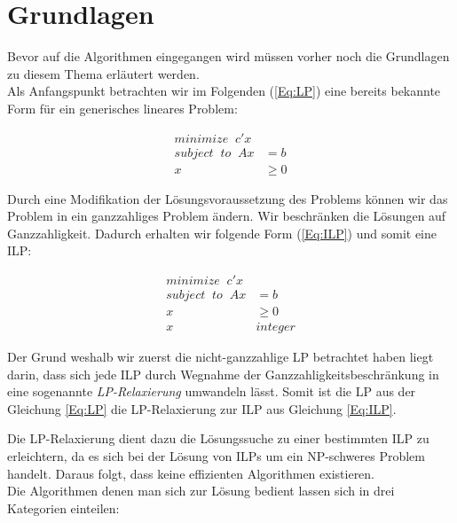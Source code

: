 \documentclass[tog]{acmsiggraph}
\begin{document}
\section{Grundlagen}

Bevor auf die Algorithmen eingegangen wird müssen vorher noch die Grundlagen zu diesem Thema erläutert werden.\\
Als Anfangspunkt betrachten wir im Folgenden (\ref{Eq:LP}) eine bereits bekannte Form für ein generisches lineares Problem:

\large
\begin{align}
\label{Eq:LP}
minimize \;\; c'x & \nonumber \\
subject \;\; to \;\; Ax &= b \nonumber \\
x &\geq 0
\end{align}
\normalsize

Durch eine Modifikation der Lösungsvoraussetzung des Problems können wir das Problem in ein ganzzahliges Problem ändern. Wir beschränken die Lösungen auf Ganzzahligkeit. Dadurch erhalten wir folgende Form (\ref{Eq:ILP}) und somit eine ILP:

\large
\begin{align}
\label{Eq:ILP}
minimize \;\; c'x & \nonumber \\
subject \;\; to \;\; Ax &= b \nonumber \\
x &\geq 0 \nonumber \\
x \;\; &integer
\end{align}
\normalsize

Der Grund weshalb wir zuerst die nicht-ganzzahlige LP betrachtet haben liegt darin, dass sich jede ILP durch Wegnahme der Ganzzahligkeitsbeschränkung in eine sogenannte \textit{LP-Relaxierung} umwandeln lässt. Somit ist die LP aus der Gleichung \ref{Eq:LP} die LP-Relaxierung zur ILP aus Gleichung \ref{Eq:ILP}.

Die LP-Relaxierung dient dazu die Lösungssuche zu einer bestimmten ILP zu erleichtern, da es sich bei der Lösung von ILPs um ein NP-schweres Problem handelt. Daraus folgt, dass keine effizienten Algorithmen existieren.\\
Die Algorithmen denen man sich zur Lösung bedient lassen sich in drei Kategorien einteilen:
\end{document}
